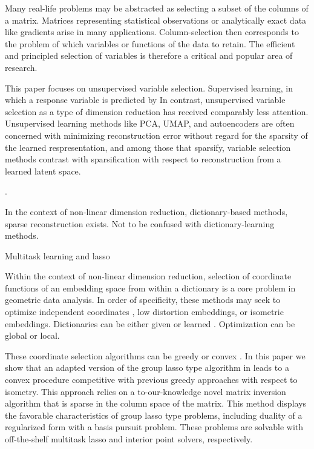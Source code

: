 \documentclass[a4paper,11pt]{article}
\begin{document}
Many real-life problems may be abstracted as selecting a subset of the columns of a matrix.
Matrices representing statistical observations or analytically exact data like gradients arise in many applications.
Column-selection then corresponds to the problem of which variables or functions of the data to retain. %
The efficient and principled selection of variables is therefore a critical and popular area of research.

This paper focuses on unsupervised variable selection.
Supervised learning, in which a response variable is predicted by
In contrast, unsupervised variable selection as a type of dimension reduction has received comparably less attention.
Unsupervised learning methods like PCA, UMAP, and autoencoders are often concerned with minimizing reconstruction error without regard for the sparsity of the learned respresentation, and among those that sparsify, variable selection methods contrast with sparsification with respect to reconstruction from a learned latent space.

. %

In the context of non-linear dimension reduction, dictionary-based methods, sparse reconstruction exists.
Not to be confused with dictionary-learning methods.

Multitask learning and lasso \cite{Hastie2015-qa}

Within the context of non-linear dimension reduction, selection of coordinate functions of an embedding space from within a dictionary is a core problem in geometric data analysis.  %
In order of specificity, these methods may seek to optimize independent coordinates \cite{Chen2019-km, He2023-ch}, low distortion embeddings, or isometric embeddings.
Dictionaries can be either given \cite{Koelle2022-ju, Koelle2024-no} or learned \cite{Kohli2021-lr}.
Optimization can be global or local.

These coordinate selection algorithms can be greedy \cite{NEURIPS2019_6a10bbd4, Kohli2021-lr, Jones2007-uc} or convex \cite{Koelle2022-ju, Koelle2024-no}.
In this paper we show that an adapted version of the group lasso type algorithm in \cite{Koelle2024-no} leads to a convex procedure competitive with previous greedy approaches with respect to isometry.
This approach relies on a to-our-knowledge novel matrix inversion algorithm that is sparse in the column space of the matrix.
This method displays the favorable characteristics of group lasso type problems, including duality of a regularized form with a basis pursuit problem.
These problems are solvable with off-the-shelf multitask lasso and interior point solvers, respectively.
\end{document}
